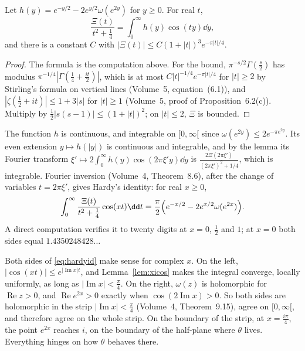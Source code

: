 \begin{lemma}\label{lem:xicos}
Let $h(y)=e^{-y/2}-2e^{y/2}\omega(e^{2y})$ for $y\ge0$. For real $t$,
\[
\frac{\Xi(t)}{t^2+\frac14}=\int_0^\infty h(y)\cos(ty)\dd y,
\]
and there is a constant $C$ with $|\Xi(t)|\le C(1+|t|)^3e^{-\pi|t|/4}$.
\end{lemma}
\begin{proof}
The formula is the computation above. For the bound, $\pi^{-s/2}\Gamma(\frac s2)$ has modulus $\pi^{-1/4}|\Gamma(\frac14+\frac{it}2)|$, which is at most $C|t|^{-1/4}e^{-\pi|t|/4}$ for $|t|\ge2$ by Stirling's formula on vertical lines (Volume~5, equation~(6.1)), and $|\zeta(\frac12+it)|\le1+3|s|$ for $|t|\ge1$ (Volume~5, proof of Proposition~6.2(c)). Multiply by $\frac12|s(s-1)|\le(1+|t|)^2$; on $|t|\le2$, $\Xi$ is bounded.
\end{proof}

The function $h$ is continuous, and integrable on $[0,\infty[$ since $\omega(e^{2y})\le2e^{-\pi e^{2y}}$. Its even extension $y\mapsto h(|y|)$ is continuous and integrable, and by the lemma its Fourier transform $\xi'\mapsto2\int_0^\infty h(y)\cos(2\pi\xi'y)\dd y$ is $\frac{2\Xi(2\pi\xi')}{(2\pi\xi')^2+1/4}$, which is integrable. Fourier inversion (Volume~4, Theorem~8.6), after the change of variables $t=2\pi\xi'$, gives Hardy's identity: for real $x\ge0$,
\begin{equation}\label{eq:hardyid}
\int_0^\infty\frac{\Xi(t)}{t^2+\frac14}\cos(xt)\dd t=\frac\pi2\Bigl(e^{-x/2}-2e^{x/2}\omega(e^{2x})\Bigr).
\end{equation}
A direct computation verifies it to twenty digits at $x=0$, $\frac12$ and $1$; at $x=0$ both sides equal $1.4350248428\ldots$

Both sides of \eqref{eq:hardyid} make sense for complex $x$. On the left, $|\cos(xt)|\le e^{|\operatorname{Im}x|t}$, and Lemma~\ref{lem:xicos} makes the integral converge, locally uniformly, as long as $|\operatorname{Im}x|<\frac\pi4$. On the right, $\omega(z)$ is holomorphic for $\operatorname{Re}z>0$, and $\operatorname{Re}e^{2x}>0$ exactly when $\cos(2\operatorname{Im}x)>0$. So both sides are holomorphic in the strip $|\operatorname{Im}x|<\frac\pi4$ (Volume~4, Theorem~9.15), agree on $[0,\infty[$, and therefore agree on the whole strip. On the boundary of the strip, at $x=\frac{i\pi}4$, the point $e^{2x}$ reaches $i$, on the boundary of the half-plane where $\theta$ lives. Everything hinges on how $\theta$ behaves there.

